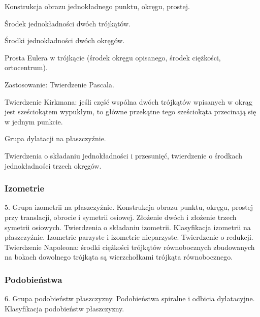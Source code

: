 Konstrukcja obrazu jednokładnego punktu, okręgu, prostej.

Środek jednokładności dwóch trójkątów.

Środki jednokładności dwóch okręgów.

Prosta Eulera w trójkącie (środek okręgu opisanego, środek ciężkości, ortocentrum).

Zastosowanie: Twierdzenie Pascala.

Twierdzenie Kirkmana: jeśli część wspólna dwóch trójkątów wpisanych w okrąg jest sześciokątem wypukłym, to główne przekątne tego sześciokąta przecinają się w jednym punkcie.

Grupa dylatacji na płaszczyźnie.

Twierdzenia o składaniu jednokładności i przesunięć, twierdzenie o środkach jednokładności trzech okręgów.

\subsubsection{Izometrie}
5.
Grupa izometrii na płaszczyźnie.
Konstrukcja obrazu punktu, okręgu, prostej przy translacji, obrocie i symetrii osiowej.
Złożenie dwóch i złożenie trzech symetrii osiowych.
Twierdzenia o składaniu izometrii.
Klasyfikacja izometrii na płaszczyźnie.
Izometrie parzyste i izometrie nieparzyste.
Twierdzenie o redukcji.
Twierdzenie Napoleona: środki ciężkości trójkątów równobocznych zbudowanych na bokach dowolnego trójkąta są wierzchołkami trójkąta równobocznego.

\subsubsection{Podobieństwa}
6.
Grupa podobieństw płaszczyzny.
Podobieństwa spiralne i odbicia dylatacyjne.
Klasyfikacja podobieństw płaszczyzny.
